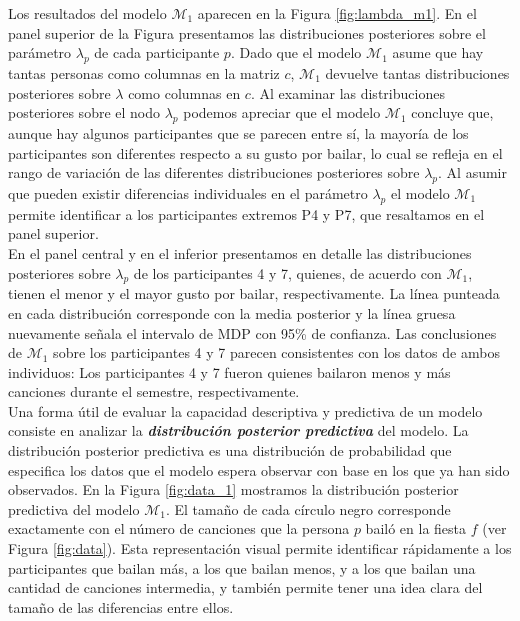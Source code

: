 \documentclass{article}
\begin{document}
\indent Los resultados del modelo $\mathcal M_1$ aparecen en la Figura \ref{fig:lambda_m1}. En el panel superior de la Figura presentamos las distribuciones posteriores sobre el parámetro $\lambda_p$ de cada participante $p$. Dado que el modelo $\mathcal M_1$ asume que hay tantas personas como columnas en la matriz $c$, $\mathcal M_1$ devuelve tantas distribuciones posteriores sobre $\lambda$ como columnas en $c$. Al examinar las distribuciones posteriores sobre el nodo $\lambda_p$ podemos apreciar que el modelo $\mathcal M_1$ concluye que, aunque hay algunos participantes que se parecen entre sí, la mayoría de los participantes son diferentes respecto a su gusto por bailar, lo cual se refleja en el rango de variación de las diferentes distribuciones posteriores sobre $\lambda_p$. Al asumir que pueden existir diferencias individuales en el parámetro $\lambda_p$ el modelo $\mathcal M_1$ permite identificar a los participantes extremos P4 y P7, que resaltamos en el panel superior.\\
\indent En el panel central y en el inferior presentamos en detalle las distribuciones posteriores sobre $\lambda_p$ de los participantes 4 y 7, quienes, de acuerdo con $\mathcal M_1$, tienen el menor y el mayor gusto por bailar, respectivamente. La línea punteada en cada distribución corresponde con la media posterior y la línea gruesa nuevamente señala el intervalo de MDP con 95\% de confianza. Las conclusiones de $\mathcal M_1$ sobre los participantes 4 y 7 parecen consistentes con los datos de ambos individuos: Los participantes 4 y 7 fueron quienes bailaron menos y más canciones durante el semestre, respectivamente.\\
\indent Una forma útil de evaluar la capacidad descriptiva y predictiva de un modelo consiste en analizar la \emph{\textbf{distribución posterior predictiva}} del modelo. La distribución posterior predictiva es una distribución de probabilidad que especifica los datos que el modelo espera observar con base en los que ya han sido observados. En la Figura \ref{fig:data_1} mostramos la distribución posterior predictiva del modelo $\mathcal M_1$. El tamaño de cada círculo negro corresponde exactamente con el número de canciones que la persona $p$ bailó en la fiesta $f$ (ver Figura \ref{fig:data}). Esta representación visual permite identificar rápidamente a los participantes que bailan más, a los que bailan menos, y a los que bailan una cantidad de canciones intermedia, y también permite tener una idea clara del tamaño de las diferencias entre ellos.
\end{document}

